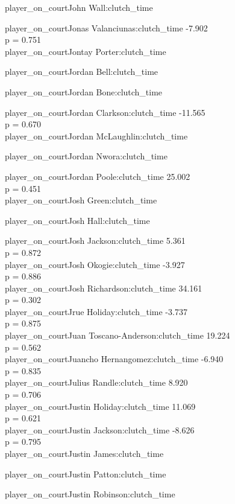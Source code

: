 \documentclass[
  landscape]{article}
\begin{document}
player\_on\_courtJohn Wall:clutch\_time

player\_on\_courtJonas Valanciunas:clutch\_time -7.902\\
p = 0.751\\
player\_on\_courtJontay Porter:clutch\_time

player\_on\_courtJordan Bell:clutch\_time

player\_on\_courtJordan Bone:clutch\_time

player\_on\_courtJordan Clarkson:clutch\_time -11.565\\
p = 0.670\\
player\_on\_courtJordan McLaughlin:clutch\_time

player\_on\_courtJordan Nwora:clutch\_time

player\_on\_courtJordan Poole:clutch\_time 25.002\\
p = 0.451\\
player\_on\_courtJosh Green:clutch\_time

player\_on\_courtJosh Hall:clutch\_time

player\_on\_courtJosh Jackson:clutch\_time 5.361\\
p = 0.872\\
player\_on\_courtJosh Okogie:clutch\_time -3.927\\
p = 0.886\\
player\_on\_courtJosh Richardson:clutch\_time 34.161\\
p = 0.302\\
player\_on\_courtJrue Holiday:clutch\_time -3.737\\
p = 0.875\\
player\_on\_courtJuan Toscano-Anderson:clutch\_time 19.224\\
p = 0.562\\
player\_on\_courtJuancho Hernangomez:clutch\_time -6.940\\
p = 0.835\\
player\_on\_courtJulius Randle:clutch\_time 8.920\\
p = 0.706\\
player\_on\_courtJustin Holiday:clutch\_time 11.069\\
p = 0.621\\
player\_on\_courtJustin Jackson:clutch\_time -8.626\\
p = 0.795\\
player\_on\_courtJustin James:clutch\_time

player\_on\_courtJustin Patton:clutch\_time

player\_on\_courtJustin Robinson:clutch\_time
\end{document}
